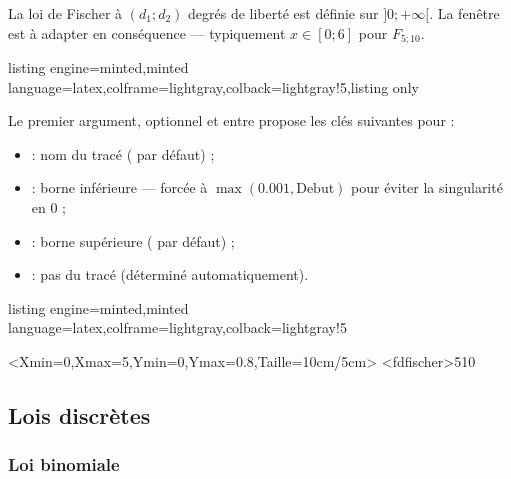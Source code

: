 \documentclass[11pt,a4paper]{ltxdoc}
\begin{document}
La loi de Fischer à $(d_1;d_2)$ degrés de liberté est définie sur $]0;+\infty[$. La fenêtre est à adapter en conséquence — typiquement $x \in [0;6]$ pour $F_{5;10}$.

\begin{tcblisting}{listing engine=minted,minted language=latex,colframe=lightgray,colback=lightgray!5,listing only}
\end{tcblisting}

Le premier argument, optionnel et entre \MontreCode{[...]} propose les clés suivantes pour  :

\begin{itemize}
  \item {} : nom du tracé ( par défaut) ;
  \item {} : borne inférieure — forcée à $\max(0.001, \text{Debut})$ pour éviter la singularité en 0 ;
  \item {} : borne supérieure ( par défaut) ;
  \item {} : pas du tracé (déterminé automatiquement).
\end{itemize}

\begin{tcblisting}{listing engine=minted,minted language=latex,colframe=lightgray,colback=lightgray!5}
\begin{GraphiqueTikz}%
    [Xgrille=1,Xgrilles=0.5,Ygrille=0.1,Ygrilles=0.05]%
    <Xmin=0,Xmax=5,Ymin=0,Ymax=0.8,Taille={10cm/5cm}>
  \TracerAxesGrilles[Elargir=2.5mm,Dernier,Derriere]{}{}
  \DefinirLoiFischer[]<fdfischer>{5}{10}
\end{GraphiqueTikz}
\end{tcblisting}

\subsection{Lois discrètes}

\subsubsection{Loi binomiale}\label{histobinom}
\end{document}
